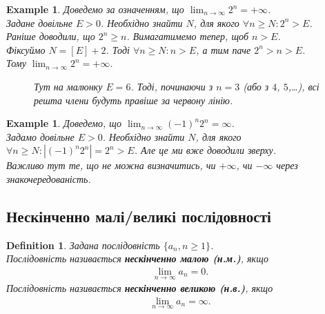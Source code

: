 \documentclass[a4paper, 14pt]{article}
\theoremstyle{theoremdd}
\theoremstyle{theoremdd}
\newtheorem{definition}[theorem]{Definition}
\theoremstyle{theoremdd}
\theoremstyle{theoremdd}
\newtheorem{example}[theorem]{Example}
\theoremstyle{theoremdd}
\theoremstyle{theoremdd}
\theoremstyle{theoremdd}
\theoremstyle{theoremdd}
\begin{document}
	\begin{example}
	Доведемо за означенням, що $\displaystyle\lim_{n \to \infty} 2^n = +\infty$.\\
	Задане довільне $E>0$. Необхідно знайти $N$, для якого $\forall n \geq N: 2^n>E$.\\
	Раніше доводили, що $2^n \geq n$. Вимагатимемо тепер, щоб $n > E$.\\
	Фіксуймо $N=\left[ E \right] + 2$. Тоді $\forall n \geq N: n > E$, а тим паче $2^n > n > E$.\\
	Тому $\displaystyle\lim_{n \to \infty} 2^n = +\infty$.
	\begin{figure}[H]
\centering
\resizebox{0.9\textwidth}{!} {
}
\caption*{Тут на малюнку $E = 6$. Тоді, починаючи з $n=3$ (або з $4$, $5$,\dots), всі решта члени будуть правіше за червону лінію.}
\end{figure}
	\end{example}

\begin{example}
Доведемо, що $\displaystyle \lim_{n \to \infty} (-1)^n 2^n = \infty$.\\
Задамо довільне $E > 0$. Необхідно знайти $N$, для якого $\forall n \geq N: |(-1)^n 2^n| = 2^n > E$. Але це ми вже доводили зверху. \\
Важливо тут те, що не можна визначитись, чи $+\infty$, чи $-\infty$ через знакочередованість.
\end{example}
	
	
	\subsection{Нескінченно малі/великі послідовності}
	\begin{definition}
	Задана послідовність $\{a_n, n \geq 1\}$. \\
	Послідовність називається \textbf{нескінченно малою (н.м.)}, якщо
	\begin{align*}
	\lim_{n \to \infty} a_n = 0.
	\end{align*}
	Послідовність називається \textbf{нескінченно великою (н.в.)}, якщо
	\begin{align*}
	\lim_{n \to \infty} a_n = \infty.
	\end{align*}
	\end{definition}
	
\end{document}
